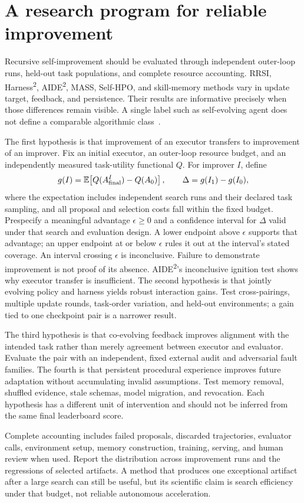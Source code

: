 \section{A research program for reliable improvement}\label{sec:C34:06}
Recursive self-improvement should be evaluated through independent outer-loop runs, held-out task populations, and complete resource accounting. RRSI, Harness\textsuperscript{2}, AIDE\textsuperscript{2}, MASS, Self-HPO, and skill-memory methods vary in update target, feedback, and persistence. Their results are informative precisely when those differences remain visible. A single label such as self-evolving agent does not define a comparable algorithmic class~\cite{rrsi2026,corpus261014224,root_aide2026,root_mass2026,root_selfhpo2026,xu2026hyperskill}.

The first hypothesis is that improvement of an executor transfers to improvement of an improver. Fix an initial executor, an outer-loop resource budget, and an independently measured task-utility functional $Q$. For improver $I$, define
\begin{equation}
 g(I)=\mathbb E\!\left[Q(A_{\rm final}^{I})-Q(A_0)\right],
 \qquad \Delta=g(I_1)-g(I_0),
\end{equation}
where the expectation includes independent search runs and their declared task sampling, and all proposal and selection costs fall within the fixed budget. Prespecify a meaningful advantage $\epsilon\geq0$ and a confidence interval for $\Delta$ valid under that search and evaluation design. A lower endpoint above $\epsilon$ supports that advantage; an upper endpoint at or below $\epsilon$ rules it out at the interval's stated coverage. An interval crossing $\epsilon$ is inconclusive. Failure to demonstrate improvement is not proof of its absence. AIDE\textsuperscript{2}'s inconclusive ignition test shows why executor transfer is insufficient. The second hypothesis is that jointly evolving policy and harness yields robust interaction gains. Test cross-pairings, multiple update rounds, task-order variation, and held-out environments; a gain tied to one checkpoint pair is a narrower result.

The third hypothesis is that co-evolving feedback improves alignment with the intended task rather than merely agreement between executor and evaluator. Evaluate the pair with an independent, fixed external audit and adversarial fault families. The fourth is that persistent procedural experience improves future adaptation without accumulating invalid assumptions. Test memory removal, shuffled evidence, stale schemas, model migration, and revocation. Each hypothesis has a different unit of intervention and should not be inferred from the same final leaderboard score.

Complete accounting includes failed proposals, discarded trajectories, evaluator calls, environment setup, memory construction, training, serving, and human review when used. Report the distribution across improvement runs and the regressions of selected artifacts. A method that produces one exceptional artifact after a large search can still be useful, but its scientific claim is search efficiency under that budget, not reliable autonomous acceleration.

